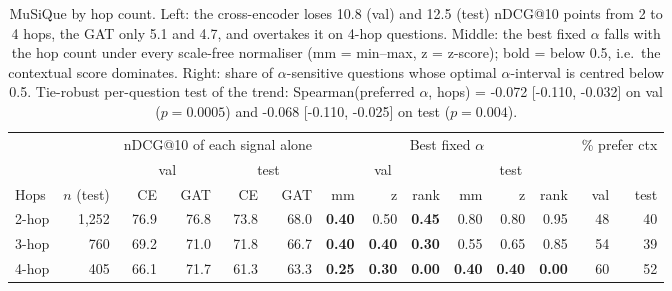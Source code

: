\begin{table}[t]
\centering\small\setlength{\tabcolsep}{4pt}
\begin{tabular}{lrrrrrrrrrrrrr}
\toprule
 & & \multicolumn{4}{c}{nDCG@10 of each signal alone} & \multicolumn{6}{c}{Best fixed $\alpha$} & \multicolumn{2}{c}{\% prefer ctx} \\
\cmidrule(lr){3-6}\cmidrule(lr){7-12}\cmidrule(lr){13-14}
 & & \multicolumn{2}{c}{val} & \multicolumn{2}{c}{test} & \multicolumn{3}{c}{val} & \multicolumn{3}{c}{test} & & \\
\cmidrule(lr){3-4}\cmidrule(lr){5-6}\cmidrule(lr){7-9}\cmidrule(lr){10-12}
Hops & $n$ (test) & CE & GAT & CE & GAT & mm & z & rank & mm & z & rank & val & test \\
\midrule
2-hop & 1,252 & 76.9 & 76.8 & 73.8 & 68.0 & \textbf{0.40} & 0.50 & \textbf{0.45} & 0.80 & 0.80 & 0.95 & 48 & 40 \\
3-hop & 760 & 69.2 & 71.0 & 71.8 & 66.7 & \textbf{0.40} & \textbf{0.40} & \textbf{0.30} & 0.55 & 0.65 & 0.85 & 54 & 39 \\
4-hop & 405 & 66.1 & 71.7 & 61.3 & 63.3 & \textbf{0.25} & \textbf{0.30} & \textbf{0.00} & \textbf{0.40} & \textbf{0.40} & \textbf{0.00} & 60 & 52 \\
\bottomrule
\end{tabular}
\caption{MuSiQue by hop count. Left: the cross-encoder loses 10.8 (val) and 12.5 (test) nDCG@10 points from 2 to 4 hops, the GAT only 5.1 and 4.7, and overtakes it on 4-hop questions. Middle: the best fixed $\alpha$ falls with the hop count under every scale-free normaliser (mm = min--max, z = z-score); bold = below 0.5, i.e.\ the contextual score dominates. Right: share of $\alpha$-sensitive questions whose optimal $\alpha$-interval is centred below 0.5. Tie-robust per-question test of the trend: Spearman(preferred $\alpha$, hops) = -0.072 [-0.110, -0.032] on val ($p=0.0005$) and -0.068 [-0.110, -0.025] on test ($p=0.004$).}
\label{tab:hops}
\end{table}
